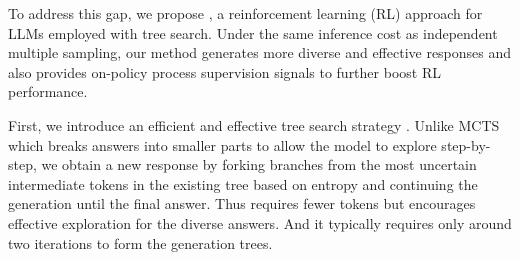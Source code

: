 
To address this gap, we propose \model, a reinforcement learning (RL) approach for LLMs employed with tree search. Under the same inference cost as independent multiple sampling, our method generates more diverse and effective responses and also provides on-policy process supervision signals to further boost RL performance.

First, we introduce an efficient and effective tree search strategy \treemodel.
Unlike MCTS which breaks answers into smaller parts to allow the model to explore step-by-step, we obtain a new response by forking branches from the most uncertain intermediate tokens in the existing tree based on entropy and continuing the generation until the final answer. Thus \treemodel requires fewer tokens but encourages effective exploration for the diverse answers.
And it typically requires only around two iterations to form the generation trees.



